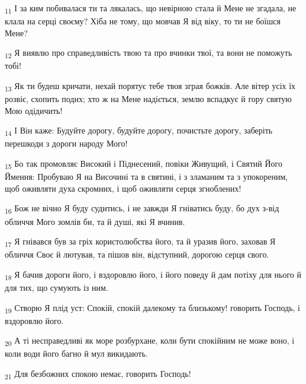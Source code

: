 \begin{tcolorbox}
\textsubscript{11} І за ким побивалася ти та лякалась, що невірною стала й Мене не згадала, не клала на серці своєму? Хіба не тому, що мовчав Я від віку, то ти не боїшся Мене?
\end{tcolorbox}
\begin{tcolorbox}
\textsubscript{12} Я виявлю про справедливість твою та про вчинки твої, та вони не поможуть тобі!
\end{tcolorbox}
\begin{tcolorbox}
\textsubscript{13} Як ти будеш кричати, нехай порятує тебе твоя зграя божків. Але вітер усіх їх розвіє, схопить подих; хто ж на Мене надіється, землю вспадкує й гору святую Мою одідичить!
\end{tcolorbox}
\begin{tcolorbox}
\textsubscript{14} І Він каже: Будуйте дорогу, будуйте дорогу, почистьте дорогу, заберіть перешкоди з дороги народу Мого!
\end{tcolorbox}
\begin{tcolorbox}
\textsubscript{15} Бо так промовляє Високий і Піднесений, повіки Живущий, і Святий Його Ймення: Пробуваю Я на Височині та в святині, і з зламаним та з упокореним, щоб оживляти духа скромних, і щоб оживляти серця згноблених!
\end{tcolorbox}
\begin{tcolorbox}
\textsubscript{16} Бож не вічно Я буду судитись, і не завжди Я гніватись буду, бо дух з-від обличчя Мого зомлів би, та й душі, які Я вчинив.
\end{tcolorbox}
\begin{tcolorbox}
\textsubscript{17} Я гнівався був за гріх користолюбства його, та й уразив його, заховав Я обличчя Своє й лютував, та пішов він, відступний, дорогою серця свого.
\end{tcolorbox}
\begin{tcolorbox}
\textsubscript{18} Я бачив дороги його, і вздоровлю його, і його поведу й дам потіху для нього й для тих, що сумують із ним.
\end{tcolorbox}
\begin{tcolorbox}
\textsubscript{19} Створю Я плід уст: Спокій, спокій далекому та близькому! говорить Господь, і вздоровлю його.
\end{tcolorbox}
\begin{tcolorbox}
\textsubscript{20} А ті несправедливі як море розбурхане, коли бути спокійним не може воно, і коли води його багно й мул викидають.
\end{tcolorbox}
\begin{tcolorbox}
\textsubscript{21} Для безбожних спокою немає, говорить Господь!
\end{tcolorbox}
